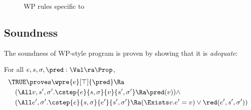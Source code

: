 \begin{figure}[!ht]
\begin{mathpar}





\end{mathpar}
\caption{WP rules specific to \irisc{}}
\end{figure}

\subsection{Soundness}

The soundness of WP-style program is proven by showing that it is \emph{adequate}:

\begin{lemma}
For all $e, s, \sigma, \pred: \Val \ra \Prop$,
\begin{align*}
&\TRUE \proves \wpre{e}[\top]{\pred} \Ra \\
&\quad (\All v, s', \sigma'. \cstep{e}{s, \sigma}{v}{s', \sigma'} \Ra \pred(v)) \land \\
&\quad (\All e', \sigma'. \cstep{e}{s, \sigma}{e'}{s', \sigma'} \Ra (\Exists v. e' = v) \lor \red(e', s', \sigma'))
\end{align*}
\end{lemma}

